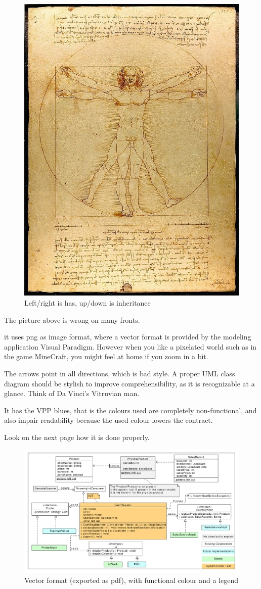 \begin{figure}
  \includegraphics[width=.4\textwidth]{images/Da_Vinci_Vitruve_Luc_Viatour.jpg}
  \caption{Left/right is has, up/down is inheritance}
\end{figure}
The picture above is wrong on many fronts.
\begin{Itemize}
\item it uses png as image format, where a vector format is provided by the modeling application Visual Paradigm.
  However when you like a pixelated world such as in the game MineCraft, you might feel at home if you zoom in a bit.
\item The arrows point in all directions, which is bad style. A proper UML class diagram should be stylish to improve comprehensibility, as it is recognizable at a glance. Think of Da Vinci's Vitruvian man.
\item It has the VPP blues, that is the colours used are completely non-functional, and also impair readability because the used colour lowers the contract.
\end{Itemize}

Look on the next page how it is done properly.
\clearpage

\begin{figure}[htbp]
  \includegraphics[width=\linewidth]{images/perishablesales.pdf}
  \caption{\label{fig:cashregistertest}Vector format (exported as pdf), with functional colour and a legend}
\end{figure}

